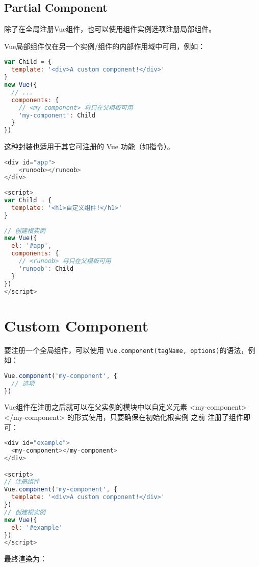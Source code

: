 \subsection{Partial Component}

除了在全局注册Vue组件，也可以使用组件实例选项注册局部组件。

Vue局部组件仅在另一个实例/组件的内部作用域中可用，例如：


\begin{lstlisting}[language=JavaScript]
var Child = {
  template: '<div>A custom component!</div>'
}
new Vue({
  // ...
  components: {
    // <my-component> 将只在父模板可用
    'my-component': Child
  }
})
\end{lstlisting}

这种封装也适用于其它可注册的 Vue 功能（如指令）。

\begin{lstlisting}[language=JavaScript]
<div id="app">
    <runoob></runoob>
</div>
 
<script>
var Child = {
  template: '<h1>自定义组件!</h1>'
}
 
// 创建根实例
new Vue({
  el: '#app',
  components: {
    // <runoob> 将只在父模板可用
    'runoob': Child
  }
})
</script>
\end{lstlisting}

\section{Custom Component}

要注册一个全局组件，可以使用 \texttt{Vue.component(tagName, options)}的语法，例如：

\begin{lstlisting}[language=JavaScript]
Vue.component('my-component', {
  // 选项
})
\end{lstlisting}


Vue组件在注册之后就可以在父实例的模块中以自定义元素 <my-component></my-component> 的形式使用，只要确保在初始化根实例 之前 注册了组件即可：


\begin{lstlisting}[language=JavaScript]
<div id="example">
  <my-component></my-component>
</div>

<script>
// 注册组件
Vue.component('my-component', {
  template: '<div>A custom component!</div>'
})
// 创建根实例
new Vue({
  el: '#example'
})
</script>
\end{lstlisting}

最终渲染为：

